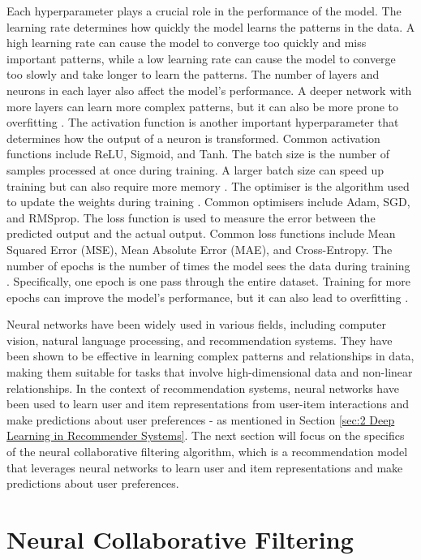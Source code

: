 Each hyperparameter plays a crucial role in the performance of the model. The learning rate determines how quickly the model learns the patterns in the data. A high learning rate can cause the model to converge too quickly and miss important patterns, while a low learning rate can cause the model to converge too slowly and take longer to learn the patterns. The number of layers and neurons in each layer also affect the model's performance. A deeper network with more layers can learn more complex patterns, but it can also be more prone to overfitting \cite{zhang2018improved}. The activation function is another important hyperparameter that determines how the output of a neuron is transformed. Common activation functions include ReLU, Sigmoid, and Tanh. The batch size is the number of samples processed at once during training. A larger batch size can speed up training but can also require more memory \cite{diaz2017effective}. The optimiser is the algorithm used to update the weights during training \cite{zhang2018improved}. Common optimisers include Adam, SGD, and RMSprop. The loss function is used to measure the error between the predicted output and the actual output. Common loss functions include Mean Squared Error (MSE), Mean Absolute Error (MAE), and Cross-Entropy. The number of epochs is the number of times the model sees the data during training \cite{diaz2017effective}. Specifically, one epoch is one pass through the entire dataset. Training for more epochs can improve the model's performance, but it can also lead to overfitting \cite{gurney2018introduction}. 

Neural networks have been widely used in various fields, including computer vision, natural language processing, and recommendation systems. They have been shown to be effective in learning complex patterns and relationships in data, making them suitable for tasks that involve high-dimensional data and non-linear relationships. In the context of recommendation systems, neural networks have been used to learn user and item representations from user-item interactions and make predictions about user preferences - as mentioned in Section \ref{sec:2 Deep Learning in Recommender Systems}. The next section will focus on the specifics of the neural collaborative filtering algorithm, which is a recommendation model that leverages neural networks to learn user and item representations and make predictions about user preferences.


\section{Neural Collaborative Filtering}
\label{sec:4 Neural Collaborative Filtering}


